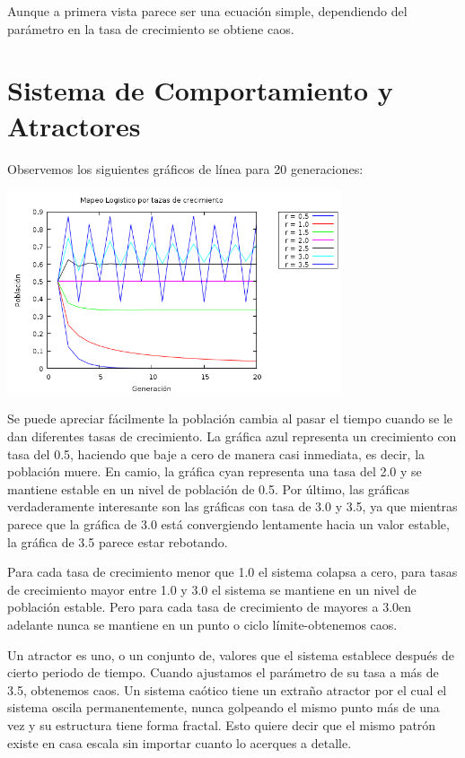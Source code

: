 \documentclass{article}
\begin{document}
Aunque a primera vista parece ser una ecuación simple, dependiendo del parámetro en la tasa de crecimiento se obtiene caos.


\section{Sistema de Comportamiento y Atractores}
Observemos los siguientes gráficos de línea para 20 generaciones:

	\begin{center}
    \includegraphics[height=6cm]{graf1.png}
    \end{center}


Se puede apreciar fácilmente la población cambia al pasar el tiempo cuando se le dan diferentes tasas de crecimiento. La gráfica azul representa un crecimiento con tasa del 0.5, haciendo que baje a cero de manera casi inmediata, es decir, la población muere. En camio, la gráfica cyan representa una tasa del 2.0 y se mantiene estable en un nivel de población de 0.5. Por último, las gráficas verdaderamente interesante son las gráficas con tasa de 3.0 y 3.5, ya que mientras parece que la gráfica de 3.0 está convergiendo lentamente hacia un valor estable, la gráfica de 3.5 parece estar rebotando.

Para cada tasa de crecimiento menor que 1.0 el sistema colapsa a cero, para tasas de crecimiento mayor entre 1.0 y 3.0 el sistema se mantiene en un nivel de población estable. Pero para cada tasa de crecimiento de mayores a 3.0en adelante nunca se mantiene en un punto o ciclo límite-obtenemos caos.

Un atractor es uno, o un conjunto de, valores que el sistema establece después de cierto periodo de tiempo. Cuando ajustamos el parámetro de su tasa a más de 3.5, obtenemos caos. Un sistema caótico tiene un extraño atractor por el cual el sistema oscila permanentemente, nunca golpeando el mismo punto más de una vez y su estructura tiene forma fractal. Esto quiere decir que el mismo patrón existe en casa escala sin importar cuanto lo acerques a detalle.
\end{document}
